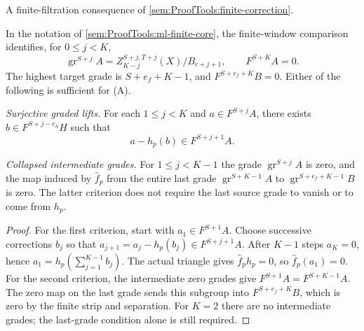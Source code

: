 \begin{lemma}
\label{sem:ProofTools:ml-ambiguity-criteria}
A finite-filtration consequence of \ref{sem:ProofTools:finite-correction}.\par
In the notation of \ref{sem:ProofTools:ml-finite-core}, the finite-window
comparison identifies, for $0\leq j<K$,
\[
 \operatorname{gr}^{S+j}A
 =Z_{K-j}^{S+j,T+j}(X)/B_{c+j+1},\qquad F^{S+K}A=0.
\]
The highest target grade is $S+e_f+K-1$, and
$F^{S+e_f+K}B=0$.
Either of the following is sufficient for (A).

\emph{Surjective graded lifts.} For each $1\leq j<K$ and
$a\in F^{S+j}A$, there exists
$b\in F^{S+j-e_h}H$ such that
\[
 a-h_p(b)\in F^{S+j+1}A.
\]

\emph{Collapsed intermediate grades.} For $1\leq j<K-1$ the grade
$\operatorname{gr}^{S+j}A$ is zero, and the map induced by $\widehat f_p$
from the entire last grade $\operatorname{gr}^{S+K-1}A$ to
$\operatorname{gr}^{S+e_f+K-1}B$ is zero.
The latter criterion does not require the last source grade to vanish
or to come from $h_p$.
\end{lemma}
\begin{proof}
For the first criterion, start with $a_1\in F^{S+1}A$. Choose successive
corrections $b_j$ so that $a_{j+1}=a_j-h_p(b_j)\in F^{S+j+1}A$.
After $K-1$ steps $a_K=0$, hence
$a_1=h_p(\sum_{j=1}^{K-1}b_j)$. The actual triangle gives
$\widehat f_ph_p=0$, so $\widehat f_p(a_1)=0$.
For the second criterion, the intermediate zero grades give
$F^{S+1}A=F^{S+K-1}A$. The zero map on the last grade sends this subgroup
into $F^{S+e_f+K}B$, which is zero by the finite strip and separation.
For $K=2$ there are no intermediate grades; the last-grade condition
alone is still required.
\end{proof}

